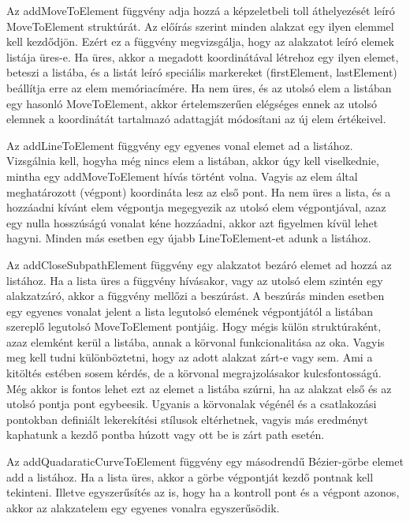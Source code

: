 \documentclass[12pt]{report}
\theoremstyle{definition}
\newcommand{\func}[1]{{\textsf{\footnotesize{#1}}}}
\begin{document}
Az \func{addMoveToElement} függvény adja hozzá a képzeletbeli toll áthelyezését
leíró \func{MoveToElement} struktúrát. Az előírás szerint minden alakzat egy
ilyen elemmel kell kezdődjön. Ezért ez a függvény megvizsgálja, hogy az
alakzatot leíró elemek listája üres-e. Ha üres, akkor a megadott koordinátával
létrehoz egy ilyen elemet, beteszi a listába, és a listát leíró speciális
markereket (\func{firstElement}, \func{lastElement}) beállítja erre az elem
memóriacímére. Ha nem üres, és az utolsó elem a listában egy hasonló
\func{MoveToElement}, akkor értelemszerűen elégséges ennek az utolsó elemnek a
koordinátát tartalmazó adattagját módosítani az új elem értékeivel.

Az \func{addLineToElement} függvény egy egyenes vonal elemet ad a listához.
Vizsgálnia kell, hogyha még nincs elem a listában, akkor úgy kell
viselkednie, mintha egy \func{addMoveToElement} hívás történt volna. Vagyis
az elem által meghatározott (végpont) koordináta lesz az első pont. Ha nem üres a
lista, és a hozzáadni kívánt elem végpontja megegyezik az utolsó elem
végpontjával, azaz egy nulla hosszúságú vonalat kéne hozzáadni, akkor
azt figyelmen kívül lehet hagyni. Minden más esetben egy újabb
\func{LineToElement}-et adunk a listához.

Az \func{addCloseSubpathElement} függvény egy alakzatot bezáró elemet ad hozzá
az listához. Ha a lista üres a függvény hívásakor, vagy az utolsó elem szintén
egy alakzatzáró, akkor a függvény mellőzi a beszúrást. A beszúrás minden
esetben egy egyenes vonalat jelent a lista legutolsó elemének végpontjától a
listában szereplő legutolsó \func{MoveToElement} pontjáig. Hogy mégis külön
struktúraként, azaz elemként kerül a listába, annak a körvonal funkcionalitása
az oka. Vagyis meg kell tudni különböztetni, hogy az adott alakzat zárt-e vagy
sem. Ami a kitöltés estében sosem kérdés, de a körvonal megrajzolásakor
kulcsfontosságú. Még akkor is fontos lehet ezt az elemet a listába szúrni, ha
az alakzat első és az utolsó pontja pont egybeesik. Ugyanis a körvonalak
végénél és a csatlakozási pontokban definiált lekerekítési stílusok
eltérhetnek, vagyis más eredményt kaphatunk a kezdő pontba húzott vagy ott be
is zárt path esetén.

Az \func{addQuadaraticCurveToElement} függvény egy másodrendű
Bézier-görbe elemet add a listához. Ha a lista üres, akkor a görbe
végpontját kezdő pontnak kell tekinteni. Illetve egyszerűsítés az is,
hogy ha a kontroll pont és a végpont azonos, akkor az alakzatelem egy egyenes
vonalra egyszerűsödik.
\end{document}
